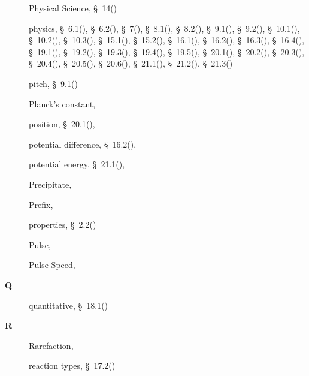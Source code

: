\begin{multicols}{2}
{\begin{description}
	  \item[] \noindent\raggedright Physical Science,  \S~14(\pageref{m37830})
	  \item[] \noindent\raggedright physics,  \S~6.1(\pageref{m38801}),  \S~6.2(\pageref{m38802}),  \S~7(\pageref{m38806}),  \S~8.1(\pageref{m38782}),  \S~8.2(\pageref{m38783}),  \S~9.1(\pageref{m38799}),  \S~9.2(\pageref{m38800}),  \S~10.1(\pageref{m38777}),  \S~10.2(\pageref{m38778}),  \S~10.3(\pageref{m38779}),  \S~15.1(\pageref{m38780}),  \S~15.2(\pageref{m38781}),  \S~16.1(\pageref{m38771}),  \S~16.2(\pageref{m38772}),  \S~16.3(\pageref{m38773}),  \S~16.4(\pageref{m38776}),  \S~19.1(\pageref{m38812}),  \S~19.2(\pageref{m38813}),  \S~19.3(\pageref{m38815}),  \S~19.4(\pageref{m38816}),  \S~19.5(\pageref{m38819}),  \S~20.1(\pageref{m38787}),  \S~20.2(\pageref{m38788}),  \S~20.3(\pageref{m38791}),  \S~20.4(\pageref{m38794}),  \S~20.5(\pageref{m38795}),  \S~20.6(\pageref{m38796}),  \S~21.1(\pageref{m38784}),  \S~21.2(\pageref{m38785}),  \S~21.3(\pageref{m38786})
	  \item[] \noindent\raggedright pitch,  \S~9.1(\pageref{m38799})
	  \item[] \noindent\raggedright Planck's constant,  \pageref{id2454271}
	  \item[] \noindent\raggedright position,  \S~20.1(\pageref{m38787}),  \pageref{id2526538}
	  \item[] \noindent\raggedright potential difference,  \S~16.2(\pageref{m38772}),  \pageref{id2479718}
	  \item[] \noindent\raggedright potential energy,  \S~21.1(\pageref{m38784}),  \pageref{id2552726}
	  \item[] \noindent\raggedright Precipitate,  \pageref{id2493039}
	  \item[] \noindent\raggedright Prefix,  \pageref{id2402460}
	  \item[] \noindent\raggedright properties,  \S~2.2(\pageref{m38734})
	  \item[] \noindent\raggedright Pulse,  \pageref{id2434846}
	  \item[] \noindent\raggedright Pulse Speed,  \pageref{id2435275}
	  \vspace{.3cm}
	  \item[{\large \bfseries Q}]\noindent\raggedright
	  quantitative,  \S~18.1(\pageref{m38717})
	  \vspace{.3cm}
	  \item[{\large \bfseries R}]\noindent\raggedright
	  Rarefaction,  \pageref{id2399653}
	  \item[] \noindent\raggedright reaction types,  \S~17.2(\pageref{m38719})

\end{description}}
\end{multicols}
